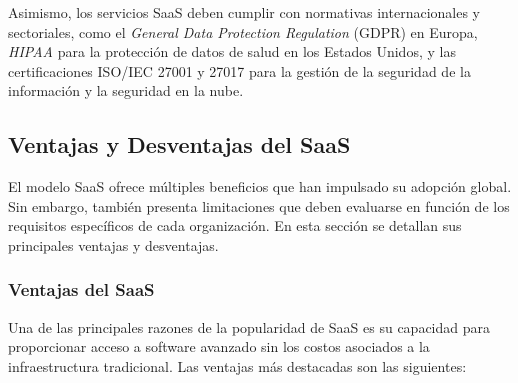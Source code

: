 {                Asimismo, los servicios SaaS deben cumplir con normativas internacionales y sectoriales, como el \textit{General Data Protection Regulation} (GDPR) en Europa, \textit{HIPAA} para la protección de datos de salud en los Estados Unidos, y las certificaciones ISO/IEC 27001 y 27017 para la gestión de la seguridad de la información y la seguridad en la nube.
                
        \subsection{Ventajas y Desventajas del SaaS}
            El modelo SaaS ofrece múltiples beneficios que han impulsado su adopción global. Sin embargo, también presenta limitaciones que deben evaluarse en función de los requisitos específicos de cada organización. En esta sección se detallan sus principales ventajas y desventajas.
        
            \subsubsection{Ventajas del SaaS}
                Una de las principales razones de la popularidad de SaaS es su capacidad para proporcionar acceso a software avanzado sin los costos asociados a la infraestructura tradicional. Las ventajas más destacadas son las siguientes:
        
}
